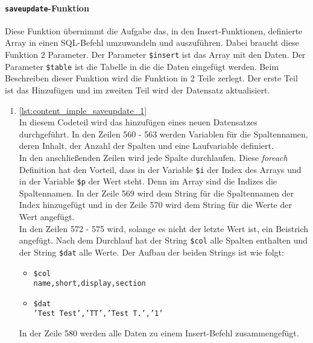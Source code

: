 \paragraph{\texttt{saveupdate}-Funktion}
\label{sec:content_imple_saveupdate}
$ ~~ $\\
Diese Funktion übernimmt die Aufgabe das, in den Insert-Funktionen, definierte Array in einen SQL-Befehl umzuwandeln und auszuführen. Dabei braucht diese Funktion 2 Parameter. Der Parameter \texttt{\$insert} ist das Array mit den Daten. Der Parameter \texttt{\$table} ist die Tabelle in die die Daten eingefügt werden. Beim Beschreiben dieser Funktion wird die Funktion in 2 Teile zerlegt. Der erste Teil ist das Hinzufügen und im zweiten Teil wird der Datensatz aktualisiert.\\

\begin{enumerate}

	\item \autoref{lst:content_imple_saveupdate_1}\\
	In diesem Codeteil wird das hinzufügen eines neuen Datensatzes durchgeführt. In den Zeilen 560 - 563 werden Variablen für die Spaltennamen, deren Inhalt, der Anzahl der Spalten und eine Laufvariable definiert.\\
	In den anschließenden Zeilen wird jede Spalte durchlaufen. Diese \textit{foreach} Definition hat den Vorteil, dass in der Variable \texttt{\$i} der Index des Arrays und in der Variable \texttt{\$p} der Wert steht. Denn im Array sind die Indizes die Spaltennamen. In der Zeile 569 wird dem String für die Spaltennamen der Index hinzugefügt und in der Zeile 570 wird dem String für die Werte der Wert angefügt.\\
	In den Zeilen 572 - 575 wird, solange es nicht der letzte Wert ist, ein Beistrich angefügt. Nach dem Durchlauf hat der String \texttt{\$col} alle Spalten enthalten und der String \texttt{\$dat} alle Werte. Der Aufbau der beiden Strings ist wie folgt:
	
	\begin{itemize}
		\item \texttt{\$col}\\
		\texttt{name,short,display,section}
		\item  \texttt{\$dat}\\
		\texttt{'Test Test','TT','Test T.','1'}
	\end{itemize}
	
	In der Zeile 580 werden alle Daten zu einem Insert-Befehl zusammengefügt.
	

\end{enumerate}
